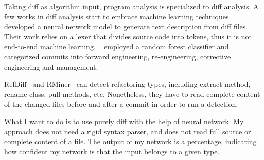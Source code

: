 Taking diff as algorithm input, program analysis is specialized to diff analysis.
A few works in diff analysis start to embrace machine learning techniques.
~\cite{loyola2017neural} developed a neural network model to generate text description from diff files.
Their work relies on a lexer that divides source code into tokens,
thus it is not end-to-end machine learning.
~\cite{macho2016predicting} employed a random forest classifier and categorized commits into forward engineering, re-engineering, corrective engineering and management.

RefDiff~\cite{silva2020refdiff} and RMiner~\cite{tsantalis2018accurate} can detect refactoring types, including extract method, rename class, pull methods, etc. Nonetheless, they have to read complete content of the changed files before and after a commit in order to run a detection.

What I want to do is to use purely diff with the help of neural network. My approach does not need a rigid syntax parser, and does not read full source or complete content of a file. The output of my network is a percentage, indicating how confident my network is that the input belongs to a given type.

